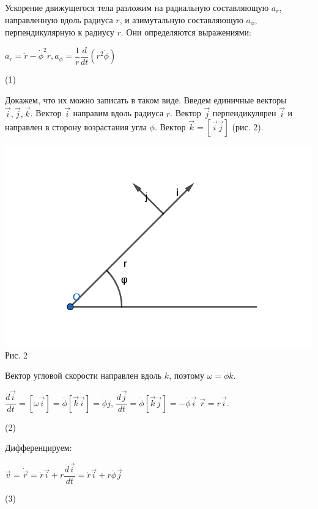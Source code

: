\documentclass[12pt,a4paper,fleqn]{article}
\begin{document}
Ускорение движущегося тела разложим на радиальную составляющую $a_r$, направленную вдоль радиуса $r$, и азимутальную составляющую $a_{\phi}$, перпендикулярную к радиусу $r$. Они определяются выражениями:
\begin{center}
$a_r = \ddot{r} - \dot{\phi}^2r, a_{\phi} = \dfrac{1}{r}\dfrac{d}{dt} \left(r^2\dot{\phi} \right)$
\begin{flushright}
(1)
\end{flushright}
\end{center}
Докажем, что их можно записать в таком виде. Введем единичные векторы $\vec{i}, \vec{j}, \vec{k}$. Вектор $\vec{i}$ направим вдоль радиуса $r$. Вектор $\vec{j}$ перпендикулярен $\vec{i}$ и направлен в сторону возрастания угла $\phi$. Вектор $\vec{k} = [\vec{i} \vec{j}]$ (рис. 2).
\begin{center}
\includegraphics[scale=0.8]{geogebra-export (1).png}
Рис. 2
\end{center}
Вектор угловой скорости направлен вдоль $k$, поэтому $\omega = \dot{\phi}k$. 
\begin{center}
$\dfrac{d \vec{i}}{dt} = [\omega \vec{i}] = \dot{\phi}[\vec{k} \vec{i}] = \dot{\phi}j$, $\dfrac{d \vec{j}}{dt} = \dot{\phi}[\vec{k} \vec{j}] = -\dot{\phi} \vec{i}$ \newline
$\vec{r} = r \vec{i}$.
\begin{flushright}
(2)
\end{flushright}
\end{center}
Дифференцируем:
\begin{center}
$\vec{v} = \dot{\vec{r}} = \dot{r} \vec{i} + r \dfrac{d \vec{i}}{dt} = \dot{r} \vec{i} + r \dot{\phi} \vec{j}$
\begin{flushright}
(3)
\end{flushright}
\end{center}
\end{document}
